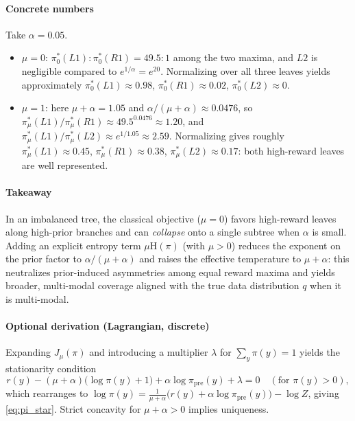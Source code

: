 \documentclass[11pt]{article}
\newcommand{\Hent}{\mathrm{H}}
\begin{document}
\paragraph{Concrete numbers}
Take $\alpha=0.05$.
\begin{itemize}
  \item $\mu=0$:
        $\pi^*_0(L1):\pi^*_0(R1)=49.5:1$ among the two maxima,
        and $L2$ is negligible compared to $e^{1/\alpha}=e^{20}$.
        Normalizing over all three leaves yields approximately
        $\pi^*_0(L1)\approx 0.98$, $\pi^*_0(R1)\approx 0.02$, $\pi^*_0(L2)\approx 0$.
  \item $\mu=1$:
        here $\mu+\alpha=1.05$ and $\alpha/(\mu+\alpha)\approx 0.0476$,
        so $\pi^*_\mu(L1)/\pi^*_\mu(R1)\approx 49.5^{0.0476}\approx 1.20$,
        and $\pi^*_\mu(L1)/\pi^*_\mu(L2)\approx e^{1/1.05}\approx 2.59$.
        Normalizing gives roughly
        $\pi^*_\mu(L1)\approx 0.45$, $\pi^*_\mu(R1)\approx 0.38$, $\pi^*_\mu(L2)\approx 0.17$:
        both high-reward leaves are well represented.
\end{itemize}

\paragraph{Takeaway}
In an imbalanced tree, the classical objective ($\mu=0$) favors high-reward leaves along high-prior branches and can \emph{collapse} onto a single subtree when $\alpha$ is small.
Adding an explicit entropy term $\mu \Hent(\pi)$ (with $\mu>0$) reduces the exponent on the prior factor to $\alpha/(\mu+\alpha)$ and raises the effective temperature to $\mu+\alpha$:
this neutralizes prior-induced asymmetries among equal reward maxima and yields broader, multi-modal coverage aligned with the true data distribution $q$ when it is multi-modal.

\paragraph{Optional derivation (Lagrangian, discrete)}
Expanding $J_\mu(\pi)$ and introducing a multiplier $\lambda$ for $\sum_y \pi(y)=1$ yields the stationarity condition
\[
r(y) - (\mu+\alpha)\big(\log \pi(y)+1\big) + \alpha\log \pi_{\mathrm{pre}}(y) + \lambda = 0
\quad (\text{for } \pi(y)>0),
\]
which rearranges to $\log \pi(y)=\tfrac{1}{\mu+\alpha}\big(r(y)+\alpha\log \pi_{\mathrm{pre}}(y)\big) - \log Z$, giving \eqref{eq:pi_star}.
Strict concavity for $\mu+\alpha>0$ implies uniqueness.
\end{document}
